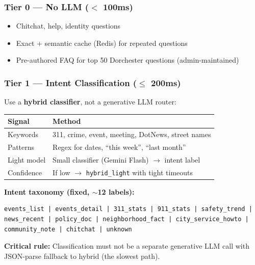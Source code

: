 \documentclass[11pt,a4paper]{article}
\begin{document}
\subsubsection{Tier 0 --- No LLM ($<$ 100ms)}
\begin{itemize}[noitemsep]
  \item Chitchat, help, identity questions
  \item Exact + semantic cache (Redis) for repeated questions
  \item Pre-authored FAQ for top 50 Dorchester questions (admin-maintained)
\end{itemize}

\subsubsection{Tier 1 --- Intent Classification ($\leq$ 200ms)}
Use a \textbf{hybrid classifier}, not a generative LLM router:

\begin{table}[h]
\centering
\small
\begin{tabular}{@{}lp{8cm}@{}}
\toprule
\textbf{Signal} & \textbf{Method} \\
\midrule
Keywords & 311, crime, event, meeting, DotNews, street names \\
Patterns & Regex for dates, ``this week'', ``last month'' \\
Light model & Small classifier (Gemini Flash) $\rightarrow$ intent label \\
Confidence & If low $\rightarrow$ \texttt{hybrid\_light} with tight timeouts \\
\bottomrule
\end{tabular}
\end{table}

\textbf{Intent taxonomy (fixed, $\sim$12 labels):}
\begin{verbatim}
events_list | events_detail | 311_stats | 911_stats | safety_trend |
news_recent | policy_doc | neighborhood_fact | city_service_howto |
community_note | chitchat | unknown
\end{verbatim}

\textbf{Critical rule:} Classification must not be a separate generative LLM call with JSON-parse fallback to hybrid (the slowest path).
\end{document}
